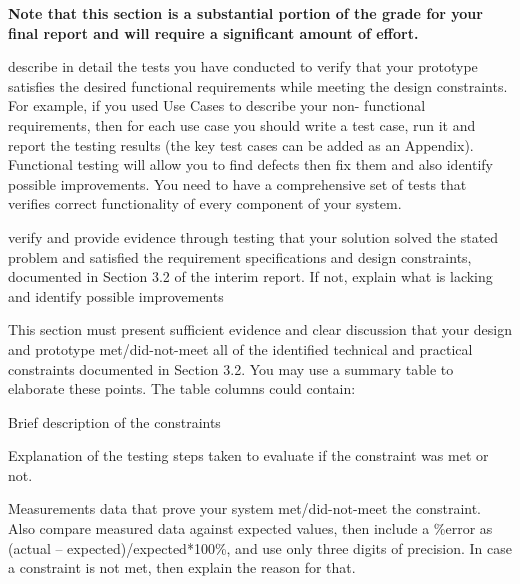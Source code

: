 \documentclass[../main.tex]{subfiles}
\begin{document}
\begin{newrequirements}
    \textbf{Note that this section is a substantial 
    portion of the grade for your final 
    report and will require a significant 
    amount of effort.}

    \begin{todolist}
    \item describe in detail the tests you have 
        conducted to verify that your prototype 
        satisfies the desired functional 
        requirements while meeting the design 
        constraints. For example, if you used 
        Use Cases to describe your non-
        functional requirements, then for each 
        use case you should write a test case, 
        run it and report the testing results
        (the key test cases can be added as an 
        Appendix). Functional testing will 
        allow you to find defects then fix them 
        and also identify possible 
        improvements.  You need to have a 
        comprehensive set of tests that 
        verifies correct functionality of every 
        component of your system. 

    \item verify and provide evidence through 
        testing that your solution solved the 
        stated problem and satisfied the 
        requirement specifications and design 
        constraints, documented in Section 3.2 
        of the interim report. If not, explain 
        what is lacking and identify possible 
        improvements 

    \item This section must present sufficient 
        evidence and clear discussion that your 
        design and prototype met/did-not-meet 
        all of the identified technical and 
        practical constraints documented in 
        Section 3.2. You may use a summary 
        table to elaborate these points. The 
        table columns could contain: 

    \begin{todolist}
    \item Brief description of the constraints 

    \item Explanation of the testing steps taken 
        to evaluate if the constraint was met 
        or not. 

    \item Measurements data that prove your 
        system met/did-not-meet the constraint. 
        Also compare measured data against 
        expected values, then include a \%error 
        as (actual – expected)/expected*100\%, 
        and use only three digits of precision. 
        In case a constraint is not met, then 
        explain the reason for that. 
    \end{todolist}


\end{todolist}
\end{newrequirements}
\end{document}
